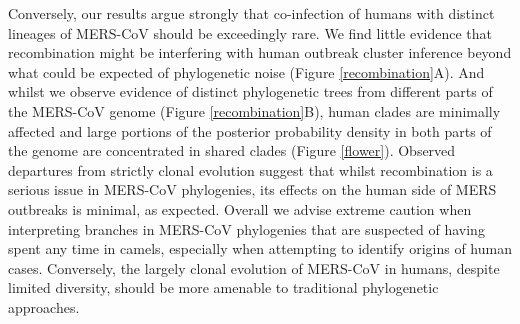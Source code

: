 \documentclass[11pt,oneside,letterpaper]{article}
\begin{document}
Conversely, our results argue strongly that co-infection of humans with distinct lineages of MERS-CoV should be exceedingly rare.
We find little evidence that recombination might be interfering with human outbreak cluster inference beyond what could be expected of phylogenetic noise (Figure \ref{recombination}A).
And whilst we observe evidence of distinct phylogenetic trees from different parts of the MERS-CoV genome (Figure \ref{recombination}B), human clades are minimally affected and large portions of the posterior probability density in both parts of the genome are concentrated in shared clades (Figure \ref{flower}).
Observed departures from strictly clonal evolution suggest that whilst recombination is a serious issue in MERS-CoV phylogenies, its effects on the human side of MERS outbreaks is minimal, as expected.
Overall we advise extreme caution when interpreting branches in MERS-CoV phylogenies that are suspected of having spent any time in camels, especially when attempting to identify origins of human cases.
Conversely, the largely clonal evolution of MERS-CoV in humans, despite limited diversity, should be more amenable to traditional phylogenetic approaches.


\end{document}
